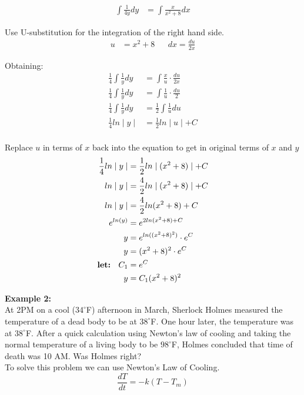 \documentclass{article}
\begin{document}
\begin{flushleft}
{\begin{align*}
\int \frac{1}{4y} dy & = \int \frac{x}{x^2 + 8} dx
\end{align*}

Use U-substitution for the integration of the right hand side.
\begin{align*}
u & = x^2 + 8  && dx = \frac{du}{2x}
\end{align*}

Obtaining: \\
\begin{align*}
\frac{1}{4}\int\frac{1}{y}dy & = \int \frac{x}{u} \cdot \frac{du}{2x} \\
\frac{1}{4}\int\frac{1}{y}dy & = \int \frac{1}{u} \cdot \frac{du}{2} \\
\frac{1}{4}\int\frac{1}{y}dy & = \frac{1}{2} \int \frac{1}{u} du \\
\frac{1}{4}ln\mid y \mid & = \frac{1}{2} ln \mid u \mid + C \\
\end{align*}

Replace $u$ in terms of $x$ back into the equation to get in original terms of $x$ and $y$\\
\begin{align*}
\frac{1}{4}ln\mid y \mid & = \frac{1}{2} ln \mid (x^2 + 8) \mid + C \\
ln\mid y \mid & = \frac{4}{2} ln \mid (x^2 + 8) \mid + C \\
ln\mid y \mid & = \frac{4}{2} ln (x^2 + 8) + C \\
e^{ln(y)} & = e^{2ln(x^2+8) + C} \\
y & = e^{ln((x^2 + 8)^2)}\cdot e^C \\
y & = (x^2 + 8)^2 \cdot e^C \\
\text {\textbf{let: } } C_1 & = e^C \\
y & = C_1(x^2 + 8)^2 \\
\end{align*}




\textbf{Example 2:}\\
At 2PM on a cool ($34^{\circ}$F)  afternoon in March, Sherlock Holmes measured the temperature of a dead body to be at $38^{\circ}$F. One hour later, the temperature was at $38^{\circ}$F. After a quick calculation using Newton’s law of cooling and taking the normal temperature of a living body to be $98^{\circ}$F, Holmes concluded that time of death was 10 AM. Was Holmes right?\\
\bigskip
To solve this problem we can use Newton's Law of Cooling.\\
\[ \frac{dT}{dt} = -k(T-T_m)\]

}
\end{flushleft}
\end{document}
